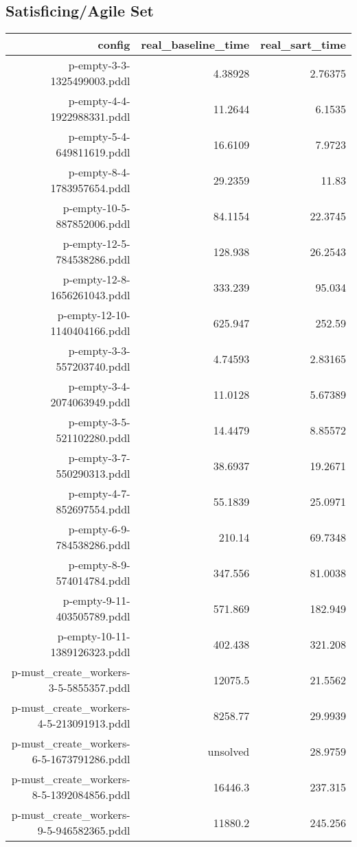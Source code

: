 \documentclass{article}
\begin{document}
                    
                    \subsection*{Satisficing/Agile Set}
                    
                            \begin{center}
                            \scriptsize
                            \begin{tabular}{r|r|r}
                            config & real\_baseline\_time & real\_sart\_time\\\midrule
                             p-empty-3-3-1325499003.pddl&4.38928&2.76375\\
 p-empty-4-4-1922988331.pddl&11.2644&6.1535\\
 p-empty-5-4-649811619.pddl&16.6109&7.9723\\
 p-empty-8-4-1783957654.pddl&29.2359&11.83\\
 p-empty-10-5-887852006.pddl&84.1154&22.3745\\
 p-empty-12-5-784538286.pddl&128.938&26.2543\\
 p-empty-12-8-1656261043.pddl&333.239&95.034\\
 p-empty-12-10-1140404166.pddl&625.947&252.59\\
 p-empty-3-3-557203740.pddl&4.74593&2.83165\\
 p-empty-3-4-2074063949.pddl&11.0128&5.67389\\
 p-empty-3-5-521102280.pddl&14.4479&8.85572\\
 p-empty-3-7-550290313.pddl&38.6937&19.2671\\
 p-empty-4-7-852697554.pddl&55.1839&25.0971\\
 p-empty-6-9-784538286.pddl&210.14&69.7348\\
 p-empty-8-9-574014784.pddl&347.556&81.0038\\
 p-empty-9-11-403505789.pddl&571.869&182.949\\
 p-empty-10-11-1389126323.pddl&402.438&321.208\\
 p-must\_create\_workers-3-5-5855357.pddl&12075.5&21.5562\\
 p-must\_create\_workers-4-5-213091913.pddl&8258.77&29.9939\\
 p-must\_create\_workers-6-5-1673791286.pddl&unsolved&28.9759\\
 p-must\_create\_workers-8-5-1392084856.pddl&16446.3&237.315\\
 p-must\_create\_workers-9-5-946582365.pddl&11880.2&245.256\\

\end{tabular}
\end{center}
\end{document}
